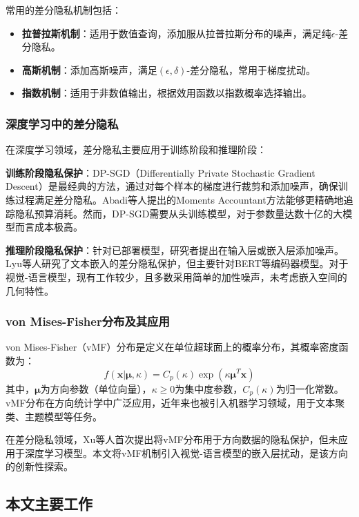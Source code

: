 \documentclass[a4paper,12pt]{article}
\begin{document}
常用的差分隐私机制包括：
\begin{itemize}
  \item \textbf{拉普拉斯机制}：适用于数值查询，添加服从拉普拉斯分布的噪声，满足纯$\epsilon$-差分隐私。
  \item \textbf{高斯机制}：添加高斯噪声，满足$(\epsilon, \delta)$-差分隐私，常用于梯度扰动。
  \item \textbf{指数机制}：适用于非数值输出，根据效用函数以指数概率选择输出。
\end{itemize}

\subsubsection{深度学习中的差分隐私}

在深度学习领域，差分隐私主要应用于训练阶段和推理阶段：

\textbf{训练阶段隐私保护}：DP-SGD（Differentially Private Stochastic Gradient Descent）是最经典的方法，通过对每个样本的梯度进行裁剪和添加噪声，确保训练过程满足差分隐私。Abadi等人提出的Moments Accountant方法能够更精确地追踪隐私预算消耗。然而，DP-SGD需要从头训练模型，对于参数量达数十亿的大模型而言成本极高。

\textbf{推理阶段隐私保护}：针对已部署模型，研究者提出在输入层或嵌入层添加噪声。Lyu等人研究了文本嵌入的差分隐私保护，但主要针对BERT等编码器模型。对于视觉-语言模型，现有工作较少，且多数采用简单的加性噪声，未考虑嵌入空间的几何特性。

\subsubsection{von Mises-Fisher分布及其应用}

von Mises-Fisher（vMF）分布是定义在单位超球面上的概率分布，其概率密度函数为：
\begin{equation}
f(\mathbf{x}|\boldsymbol{\mu}, \kappa) = C_p(\kappa) \exp(\kappa \boldsymbol{\mu}^T \mathbf{x})
\end{equation}
其中，$\boldsymbol{\mu}$为方向参数（单位向量），$\kappa \geq 0$为集中度参数，$C_p(\kappa)$为归一化常数。vMF分布在方向统计学中广泛应用，近年来也被引入机器学习领域，用于文本聚类、主题模型等任务。

在差分隐私领域，Xu等人首次提出将vMF分布用于方向数据的隐私保护，但未应用于深度学习模型。本文将vMF机制引入视觉-语言模型的嵌入层扰动，是该方向的创新性探索。

\subsection{本文主要工作}
\end{document}
